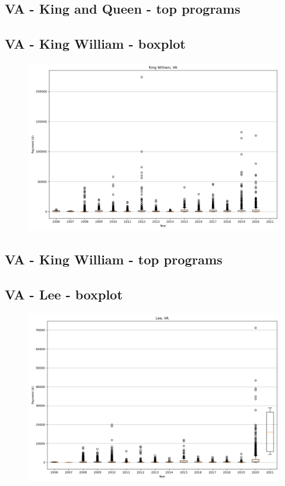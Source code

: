 \subsection*{VA - King and Queen - top programs}

\newpage
\subsection*{VA - King William - boxplot}
\begin{figure}[h]
\centering
\includegraphics[width=7in]{../output/boxplots/counties/King William-VA_boxplot.png}
\end{figure}


\subsection*{VA - King William - top programs}

\newpage
\subsection*{VA - Lee - boxplot}
\begin{figure}[h]
\centering
\includegraphics[width=7in]{../output/boxplots/counties/Lee-VA_boxplot.png}
\end{figure}


